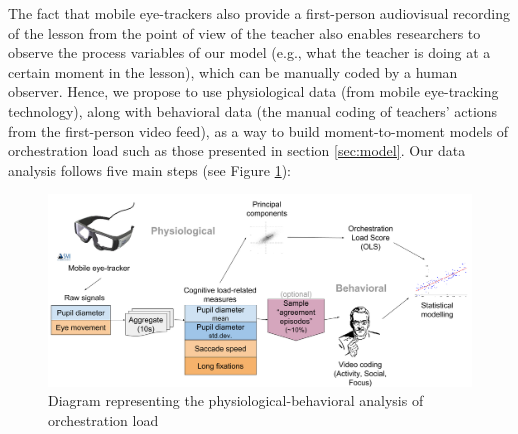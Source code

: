 \documentclass[10pt,journal,compsoc]{IEEEtran}
\begin{document}
The fact that mobile eye-trackers also provide a first-person audiovisual recording of the lesson from the point of view of the teacher also enables researchers to observe the process variables of our model (e.g., what the teacher is doing at a certain moment in the lesson), which can be manually coded by a human observer. Hence, we propose to use physiological data (from mobile eye-tracking technology), along with behavioral data (the manual coding of teachers' actions from the first-person video feed), as a way to build moment-to-moment models of orchestration load such as those presented in section \ref{sec:model}. Our data analysis follows five main steps (see Figure \ref{fig:analysis}):

\begin{figure}[!t]
\centering
\includegraphics[width=\linewidth]{img/AnalysisMethodBase.png}
\caption{Diagram representing the physiological-behavioral analysis of orchestration load}
\label{fig:analysis}
\end{figure}
\end{document}

